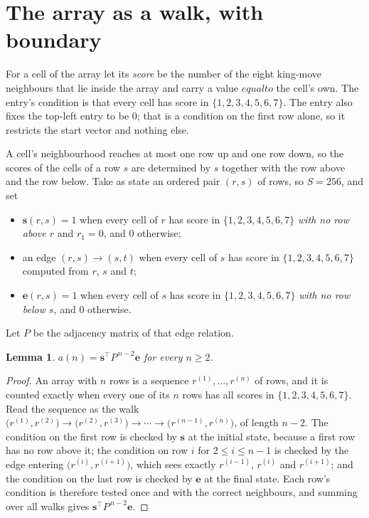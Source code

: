 \documentclass[11pt,a4paper]{article}
\theoremstyle{plain}
\newtheorem{lemma}[theorem]{Lemma}
\theoremstyle{definition}
\begin{document}
\section{The array as a walk, with boundary}

For a cell of the array let its \emph{score} be the number of the eight king-move neighbours that lie inside
the array and carry a value $equal to$ the cell's own. The entry's condition is that every cell
has score in $\{1,2,3,4,5,6,7\}$. The entry also fixes the top-left entry to be $0$; that is a condition on the first row alone, so it restricts the start vector and nothing else.

A cell's neighbourhood reaches at most one row up and one row down, so the scores of the
cells of a row $s$ are determined by $s$ together with the row above and the row below.
Take as state an ordered pair $(r,s)$ of rows, so $S=256$, and set
\begin{itemize}
\item $\mathbf{s}(r,s)=1$ when every cell of $r$ has score in $\{1,2,3,4,5,6,7\}$ \emph{with no row
above $r$} and $r_1=0$, and $0$ otherwise;
\item an edge $(r,s)\to(s,t)$ when every cell of $s$ has score in $\{1,2,3,4,5,6,7\}$ computed from
$r$, $s$ and $t$;
\item $\mathbf{e}(r,s)=1$ when every cell of $s$ has score in $\{1,2,3,4,5,6,7\}$ \emph{with no row
below $s$}, and $0$ otherwise.
\end{itemize}
Let $P$ be the adjacency matrix of that edge relation.

\begin{lemma}\label{lem:walk}
$a(n)=\mathbf{s}^{\!\top}P^{\,n-2}\mathbf{e}$ for every $n\ge2$.
\end{lemma}

\begin{proof}
An array with $n$ rows is a sequence $r^{(1)},\dots,r^{(n)}$ of rows, and it is counted
exactly when every one of its $n$ rows has all scores in $\{1,2,3,4,5,6,7\}$. Read the sequence as the
walk $\bigl(r^{(1)},r^{(2)}\bigr)\to\bigl(r^{(2)},r^{(3)}\bigr)\to\cdots\to
\bigl(r^{(n-1)},r^{(n)}\bigr)$, of length $n-2$. The condition on the first row is
checked by $\mathbf{s}$ at the initial state, because a first row has no row above it; the
condition on row $i$ for $2\le i\le n-1$ is checked by the edge entering
$\bigl(r^{(i)},r^{(i+1)}\bigr)$, which sees exactly $r^{(i-1)}$, $r^{(i)}$ and
$r^{(i+1)}$; and the condition on the last row is checked by $\mathbf{e}$ at the final
state. Each row's condition is therefore tested once and with the correct neighbours, and
summing over all walks gives $\mathbf{s}^{\!\top}P^{\,n-2}\mathbf{e}$.
\end{proof}
\end{document}
